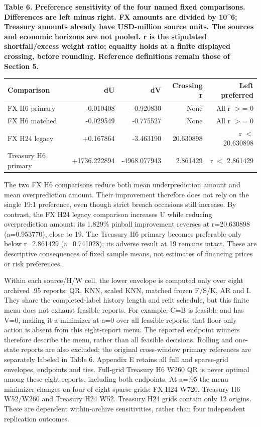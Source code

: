 \documentclass[10pt,a4paper]{article}
\begin{document}
\begin{center}
\begin{minipage}{\linewidth}
\small\textbf{Table 6. Preference sensitivity of the four named fixed comparisons. Differences are left minus right. FX amounts are divided by 10\textasciicircum{}6; Treasury amounts already have USD-million source units. The sources and economic horizons are not pooled. r is the stipulated shortfall/excess weight ratio; equality holds at a finite displayed crossing, before rounding. Reference definitions remain those of Section 5.}\par\medskip
\centering\fontsize{8}{10}\selectfont
\begin{tabular}{lrrrr}
\toprule
Comparison & dU & dV & Crossing r & Left preferred \\
\midrule
FX H6 primary & -0.010408 & -0.920830 & None & All r \( > \)= 0 \\
FX H6 matched & -0.029549 & -0.775527 & None & All r \( > \)= 0 \\
FX H24 legacy & +0.167864 & -3.463190 & 20.630898 & r \( < \) 20.630898 \\
Treasury H6 primary & +1736.222894 & -4968.077943 & 2.861429 & r \( < \) 2.861429 \\
\bottomrule
\end{tabular}
\end{minipage}
\end{center}
The two FX H6 comparisons reduce both mean underprediction amount and mean overprediction amount. Their improvement therefore does not rely on the single 19:1 preference, even though strict breach occasions still increase. By contrast, the FX H24 legacy comparison increases U while reducing overprediction amount: its 1.829\% pinball improvement reverses at r=20.630898 (a=0.953770), close to 19. The Treasury H6 primary becomes preferable only below r=2.861429 (a=0.741028); its adverse result at 19 remains intact. These are descriptive consequences of fixed sample means, not estimates of financing prices or risk preferences.

Within each source/H/W cell, the lower envelope is computed only over eight archived .95 reports: QR, KNN, scaled KNN, matched frozen F/S/K, AR and I. They share the completed-label history length and refit schedule, but this finite menu does not exhaust feasible reports. For example, C=B is feasible and has V=0, making it a minimizer at a=0 over all feasible reports; that floor-only action is absent from this eight-report menu. The reported endpoint winners therefore describe the menu, rather than all feasible decisions. Rolling and one-state reports are also excluded; the original cross-window primary references are separately labeled in Table 6. Appendix E retains all full and sparse-grid envelopes, endpoints and ties. Full-grid Treasury H6 W260 QR is never optimal among these eight reports, including both endpoints. At a=.95 the menu minimizer changes on four of eight sparse grids: FX H24 W720, Treasury H6 W52/W260 and Treasury H24 W52. Treasury H24 grids contain only 12 origins. These are dependent within-archive sensitivities, rather than four independent replication outcomes.
\end{document}
